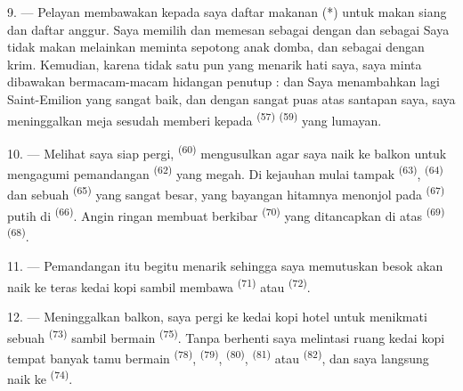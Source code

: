 \VUsaut{4.0mm}
\VUsaut{3.0mm}

9. --- Pelayan membawakan kepada saya daftar makanan (*) untuk makan
siang dan daftar anggur. Saya memilih dan memesan sebagai
  dengan  dan sebagai
  Saya tidak makan
 melainkan meminta sepotong  anak domba, dan
sebagai   dengan krim.
Kemudian, karena tidak satu pun  yang menarik
hati saya, saya minta dibawakan bermacam-macam hidangan penutup :
  dan  Saya menambahkan
lagi  Saint-Emilion yang sangat baik, dan dengan sangat
puas atas santapan saya, saya meninggalkan meja sesudah memberi kepada
 \textsuperscript{(57)} 
\textsuperscript{(59)} yang lumayan.

10. --- Melihat saya siap pergi, 
\textsuperscript{(60)} mengusulkan agar saya naik ke balkon untuk
mengagumi pemandangan  \textsuperscript{(62)} yang
megah. Di kejauhan mulai tampak 
\textsuperscript{(63)}, 
\textsuperscript{(64)} dan sebuah 
\textsuperscript{(65)} yang sangat besar, yang bayangan hitamnya
menonjol pada  \textsuperscript{(67)} putih di
 \textsuperscript{(66)}. Angin ringan membuat
berkibar  \textsuperscript{(70)} yang ditancapkan di atas
 \textsuperscript{(69)} 
\textsuperscript{(68)}.

\VUsaut{3.0mm}
\VUsaut{3.0mm}

11. --- Pemandangan itu begitu menarik sehingga saya memutuskan besok
akan naik ke teras kedai kopi sambil membawa 
\textsuperscript{(71)} atau  \textsuperscript{(72)}.

12. --- Meninggalkan balkon, saya pergi ke kedai kopi hotel untuk
menikmati sebuah  \textsuperscript{(73)} sambil bermain
 \textsuperscript{(75)}. Tanpa berhenti saya melintasi
ruang kedai kopi tempat banyak tamu bermain 
\textsuperscript{(78)},  \textsuperscript{(79)},
 \textsuperscript{(80)}, 
\textsuperscript{(81)} atau  \textsuperscript{(82)}, dan
saya langsung naik ke  \textsuperscript{(74)}.

